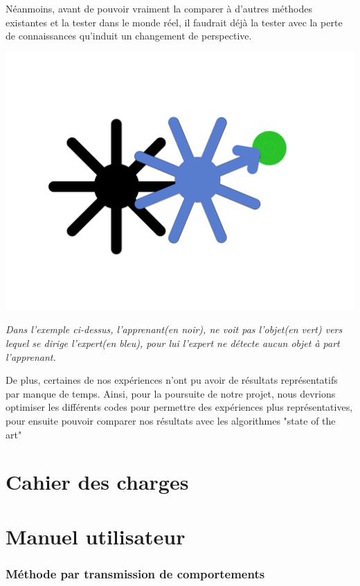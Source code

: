 \documentclass[a4paper, 12pt]{report}
\begin{document}
Néanmoins, avant de pouvoir vraiment la comparer à d'autres méthodes existantes et la tester dans le monde réel, il faudrait déjà la tester avec la perte de connaissances qu'induit un changement de perspective.
\begin{center}
	\includegraphics[scale = 0.5]{scheme.png}
\end{center}
\textit{Dans l'exemple ci-dessus, l'apprenant(en noir), ne voit pas l'objet(en vert) vers lequel se dirige l'expert(en bleu), pour lui l'expert ne détecte aucun objet à part l'apprenant.}

De plus, certaines de nos expériences n'ont pu avoir de résultats représentatifs par manque de temps. Ainsi, pour la poursuite de notre projet, nous devrions optimiser les différents codes pour permettre des expériences plus représentatives, pour ensuite pouvoir comparer nos résultats avec les algorithmes "state of the art"


    \appendix

    \chapter{Cahier des charges}

    \chapter{Manuel utilisateur}
     
     
    \subsection{Méthode par transmission de comportements}
    
\end{document}
